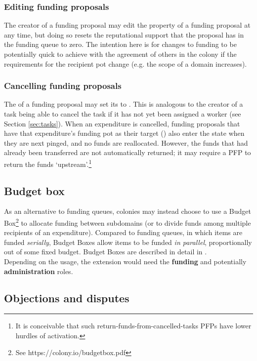 \subsubsection{Editing funding proposals}
The creator of a funding proposal may edit the  property of a funding proposal at any time, but doing so resets the reputational support that the proposal has in the funding queue to zero. The intention here is for changes to funding to be potentially quick to achieve with the agreement of others in the colony if the requirements for the recipient pot change (e.g. the scope of a domain increases).

\subsubsection{Cancelling funding proposals}
The  of a funding proposal may set its  to . This is analogous to the creator of a task being able to cancel the task if it has not yet been assigned a worker (see Section \ref{sec:tasks}). When an expenditure is cancelled, funding proposals that have that expenditure's funding pot as their target () also enter the  state when they are next pinged, and no funds are reallocated. However, the funds that had already been transferred are not automatically returned; it may require a PFP to return the funds `upstream'.\footnote{It is conceivable that such return-funds-from-cancelled-tasks PFPs have lower hurdles of activation.}

\subsection{Budget box}\label{sec:budget-box}

As an alternative to funding queues, colonies may instead choose to use a Budget Box\footnote{See https://colony.io/budgetbox.pdf} to allocate funding between subdomains (or to divide funds among multiple recipients of an expenditure). Compared to funding queues, in which items are funded \textit{serially}, Budget Boxes allow items to be funded \textit{in parallel}, proportionally out of some fixed budget. Budget Boxes are described in detail in \cite{BudgetBox}. \\

Depending on the usage, the extension would need the \textbf{funding} and potentially \textbf{administration} roles.

\subsection{Objections and disputes}\label{sec:objections-and-disputes}

